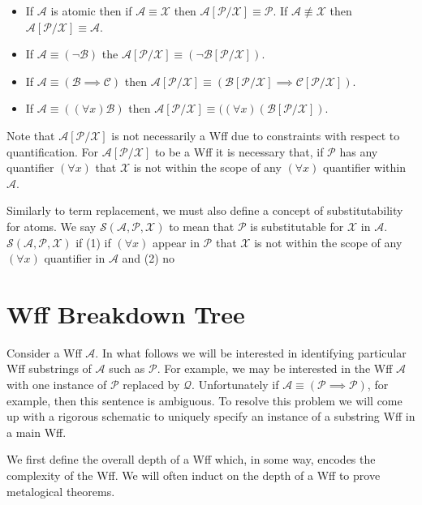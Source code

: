 \documentclass[12pt]{article}
\theoremstyle{break}
\theoremstyle{break}
\theoremstyle{break}
\theoremstyle{break}
\newcommand{\mc}[1]{\mathcal{#1}}
\begin{document}
\hrulefill
\begin{itemize}
\item{If $\mc{A}$ is atomic then if $\mc{A}\equiv \mc{X}$ then $\mc{A}[\mc{P}/\mc{X}] \equiv \mc{P}$. If $\mc{A}\not\equiv \mc{X}$ then $\mc{A}[\mc{P}/\mc{X}] \equiv \mc{A}$.}
\item{If $\mc{A} \equiv (\lnot \mc{B})$ the $\mc{A}[\mc{P}/\mc{X}] \equiv (\lnot \mc{B}[\mc{P}/\mc{X}])$.}
\item{If $\mc{A} \equiv (\mc{B} \implies \mc{C})$ then $\mc{A}[\mc{P}/\mc{X}] \equiv (\mc{B}[\mc{P}/\mc{X}] \implies \mc{C}[\mc{P}/\mc{X}])$.}
\item{If $\mc{A} \equiv ((\forall x)\mc{B})$ then $\mc{A}[\mc{P}/\mc{X}] \equiv ((\forall x) (\mc{B}[\mc{P}/\mc{X}])$.}
\end{itemize}
\hrulefill

Note that $\mc{A}[\mc{P}/\mc{X}]$ is not necessarily a Wff due to constraints with respect to quantification.
For $\mc{A}[\mc{P}/\mc{X}]$ to be a Wff it is necessary that, if $\mc{P}$ has any quantifier $(\forall x)$ that $\mc{X}$ is not within the scope of any $(\forall x)$ quantifier within $\mc{A}$.

Similarly to term replacement, we must also define a concept of substitutability for atoms. We say $\mc{S}(\mc{A}, \mc{P}, \mc{X})$ to mean that $\mc{P}$ is substitutable for $\mc{X}$ in $\mc{A}$. $\mc{S}(\mc{A}, \mc{P}, \mc{X})$ if (1) if $(\forall x)$ appear in $\mc{P}$ that $\mc{X}$ is not within the scope of any $(\forall x)$ quantifier in $\mc{A}$ and (2) no  

\section{Wff Breakdown Tree}

Consider a Wff $\mc{A}$.
In what follows we will be interested in identifying particular Wff substrings of $\mc{A}$ such as $\mc{P}$.
For example, we may be interested in the Wff $\mc{A}$ with one instance of $\mc{P}$ replaced by $\mc{Q}$.
Unfortunately if $\mc{A} \equiv (\mc{P} \implies \mc{P})$, for example, then this sentence is ambiguous. 
To resolve this problem we will come up with a rigorous schematic to uniquely specify an instance of a substring Wff in a main Wff.

We first define the overall depth of a Wff which, in some way, encodes the complexity of the Wff.
We will often induct on the depth of a Wff to prove metalogical theorems.

\hrulefill
\end{document}
